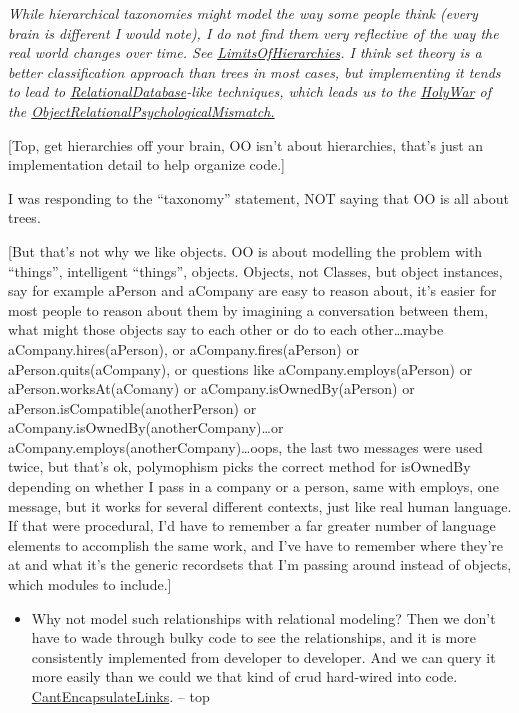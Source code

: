 \documentclass[10pt,twoside,openright]{memoir}
\begin{document}
\emph{While hierarchical taxonomies might model the way \emph{some} people think (every brain is different I would note), I do not find them very reflective of the way the real world changes over time. See \ul{LimitsOfHierarchies}. I think set theory is a better classification approach than trees in most cases, but implementing it tends to lead to \ul{RelationalDatabase}-like techniques, which leads us to the \ul{HolyWar} of the \ul{ObjectRelationalPsychologicalMismatch.}}

[Top, get hierarchies off your brain, OO isn't about hierarchies, that's just an implementation detail to help organize code.]

I was responding to the ``taxonomy'' statement, NOT saying that OO is all about trees.

[But that's not why we like objects. OO is about modelling the problem with ``things'', intelligent ``things'', objects. Objects, not Classes, but object instances, say for example aPerson and aCompany are easy to reason about, it's easier for most people to reason about them by imagining a conversation between them, what might those objects say to each other or do to each other\dots maybe aCompany.hires(aPerson), or aCompany.fires(aPerson) or aPerson.quits(aCompany), or questions like aCompany.employs(aPerson) or aPerson.worksAt(aComany) or aCompany.isOwnedBy(aPerson) or aPerson.isCompatible(anotherPerson) or aCompany.isOwnedBy(anotherCompany)\dots or aCompany.employs(anotherCompany)\dots oops, the last two messages were used twice, but that's ok, polymophism picks the correct method for isOwnedBy depending on whether I pass in a company or a person, same with employs, one message, but it works for several different contexts, just like real human language. If that were procedural, I'd have to remember a far greater number of language elements to accomplish the same work, and I've have to remember where they're at and what it's the generic recordsets that I'm passing around instead of objects, which modules to include.]

\begin{itemize}
\item Why not model such relationships with relational modeling? Then we don't have to wade through bulky code to see the relationships, and it is more consistently implemented from developer to developer. And we can query it more easily than we could we that kind of crud hard-wired into code. \ul{CantEncapsulateLinks}. -- top
\end{itemize}
\end{document}
